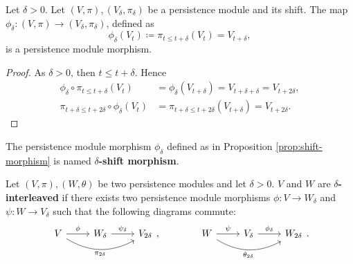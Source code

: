 \begin{proposition} \label{prop:shift-morphism}
    Let $ \delta > 0 $. Let $(V, \pi), (V_\delta, \pi_\delta) $ be a persistence module and its shift. The map $ \phi_\delta \colon (V, \pi) \to (V_\delta, \pi_\delta) $, defined as
    \begin{equation}
        \phi_\delta (V_t) \coloneq \pi_{t \leq t + \delta}(V_t) = V_{t+\delta},
    \end{equation}
    is a persistence module morphism.
\end{proposition}
\begin{proof}
    As $ \delta > 0 $, then $ t \leq t+\delta $. Hence
    \begin{align}
        \phi_\delta \circ \pi_{t \leq t+\delta} (V_t) &= \phi_\delta (V_{t+\delta}) = V_{t+\delta+\delta} = V_{t+2 \delta}, \\
        \pi_{t+\delta \leq t+2\delta} \circ \phi_\delta (V_t) &= \pi_{t+\delta \leq t+2\delta}(V_{t+\delta}) = V_{t+2 \delta}.
    \end{align}
\end{proof}

\begin{definition}
    The persistence module morphism $ \phi_\delta $ defined as in Proposition \ref{prop:shift-morphism} is named {\bf $\delta$-shift morphism}.
\end{definition}

\begin{definition}
    Let $ (V, \pi), (W, \theta) $ be two persistence modules and let $ \delta > 0 $. $ V $ and $ W $ are {\bf $\delta$-interleaved } if there exists two persistence module morphisms $ \phi \colon V \to W_\delta $ and $ \psi \colon W \to V_\delta $ such that the following diagrams commute:
    \begin{equation}
        \begin{array}{ccc}
        \begin{tikzcd}
            V \arrow[r, "\phi"] \arrow[rr, "\pi_{2\delta}"', bend right] & W_\delta \arrow[r, "\psi_\delta"] & V_{2\delta}
        \end{tikzcd},
        &
        \quad \quad
        &
        \begin{tikzcd}
            W \arrow[r, "\psi"] \arrow[rr, "\theta_{2\delta}"', bend right] & V_\delta \arrow[r, "\phi_\delta"] & W_{2\delta}
        \end{tikzcd}.
        \end{array}
    \end{equation}
\end{definition}

